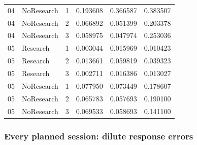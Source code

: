 \documentclass[10pt,a4paper]{article}
\begin{document}
{\begin{longtable}[]{@{}llllll@{}}
04 & NoResearch & 1 & 0.193608 & 0.366587 & 0.383507 \\
04 & NoResearch & 2 & 0.066892 & 0.051399 & 0.203378 \\
04 & NoResearch & 3 & 0.058975 & 0.047974 & 0.253036 \\
05 & Research & 1 & 0.003044 & 0.015969 & 0.010423 \\
05 & Research & 2 & 0.013661 & 0.059819 & 0.039323 \\
05 & Research & 3 & 0.002711 & 0.016386 & 0.013027 \\
05 & NoResearch & 1 & 0.077950 & 0.073449 & 0.178607 \\
05 & NoResearch & 2 & 0.065783 & 0.057693 & 0.190100 \\
05 & NoResearch & 3 & 0.069533 & 0.058693 & 0.141100 \\
\end{longtable}\normalsize
}

\subsubsection{Every planned session: dilute response errors}\label{every-planned-session-dilute-response-errors}
\end{document}
